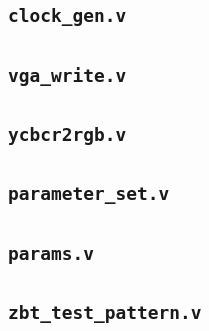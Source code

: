 \documentclass[10pt]{article}
\begin{document}

	  	
\subsection{{\tt clock\_gen.v}}

	  	
\subsection{{\tt vga\_write.v}}
	  	

	  	
\subsection{{\tt ycbcr2rgb.v}}
	  	

	  	
\subsection{{\tt parameter\_set.v}}	  	

\subsection{{\tt params.v}}	  	
	  	
\subsection{{\tt zbt\_test\_pattern.v}}  	

\end{document}
